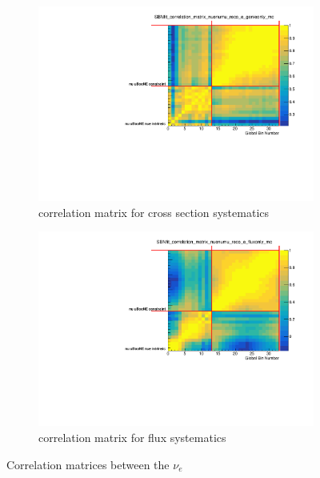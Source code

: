 \documentclass[a4paper]{article}
\begin{document}
\begin{figure}[ht] 
\begin{center}
    \begin{subfigure}[b]{0.45\textwidth}
    \centering
    \includegraphics[width=1.00\textwidth]{Sensitivity/numuconstraint/SBNfit_correlation_matrix_nuenumu_reco_e_genieonly_mc_collapsed.pdf}
    \caption{correlation matrix for cross section systematics}
    \end{subfigure}
    \begin{subfigure}[b]{0.45\textwidth}
    \centering
    \includegraphics[width=1.00\textwidth]{Sensitivity/numuconstraint/SBNfit_correlation_matrix_nuenumu_reco_e_fluxonly_mc_collapsed.pdf}
    \caption{correlation matrix for flux systematics}
    \end{subfigure}
\caption{\label{fig:fluxmatrices} Correlation matrices between the $\nu_e$}
\end{center}
\end{figure}
\end{document}

